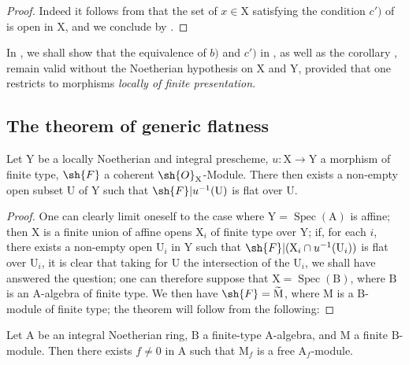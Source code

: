 \begin{proof}
Indeed it follows from  that the set of $x\in\mathrm{X}$ satisfying the condition $c')$ of  is open in $\mathrm{X}$, and we conclude by .
\end{proof}

\begin{remark}[6.8.8]
\label{IV.6.8.8}
In , we shall show that the equivalence of $b)$ and $c')$ in , as well as the corollary , remain valid without the Noetherian hypothesis on $\mathrm{X}$ and $\mathrm{Y}$, provided that one restricts to morphisms \emph{locally of finite presentation}.
\end{remark}

\subsection{The theorem of generic flatness}
\label{subsection:IV.6.9}


\begin{theorem}[6.9.1]
\label{IV.6.9.1}
Let $\mathrm{Y}$ be a locally Noetherian and integral prescheme, $u:\mathrm{X}\to\mathrm{Y}$ a morphism of finite type, $\sh{F}$ a coherent $\sh{O}_\mathrm{X}$-Module. There then exists a non-empty open subset $\mathrm{U}$ of $\mathrm{Y}$ such that $\sh{F}|u^{-1}(\mathrm{U})$ is flat over $\mathrm{U}$.
\end{theorem}

\begin{proof}
One can clearly limit oneself to the case where $\mathrm{Y}=\operatorname{Spec}(\mathrm{A})$ is affine; then $\mathrm{X}$ is a finite union of affine opens $\mathrm{X}_i$ of finite type over $\mathrm{Y}$; if, for each $i$, there exists a non-empty open $\mathrm{U}_i$ in $\mathrm{Y}$ such that $\sh{F}|(\mathrm{X}_i\cap u^{-1}(\mathrm{U}_i))$ is flat over $\mathrm{U}_i$, it is clear that taking for $\mathrm{U}$ the intersection of the $\mathrm{U}_i$, we shall have answered the question; one can therefore suppose that $\mathrm{X}=\operatorname{Spec}(\mathrm{B})$, where $\mathrm{B}$ is an $\mathrm{A}$-algebra of finite type. We then have $\sh{F}=\widetilde{\mathrm{M}}$, where $\mathrm{M}$ is a $\mathrm{B}$-module of finite type; the theorem will follow from the following:
\end{proof}

\begin{lemma}[6.9.2]
\label{IV.6.9.2}
Let $\mathrm{A}$ be an integral Noetherian ring, $\mathrm{B}$ a finite-type $\mathrm{A}$-algebra, and $\mathrm{M}$ a finite $\mathrm{B}$-module. Then there exists $f\neq 0$ in $\mathrm{A}$ such that $\mathrm{M}_f$ is a free $\mathrm{A}_f$-module.
\end{lemma}

